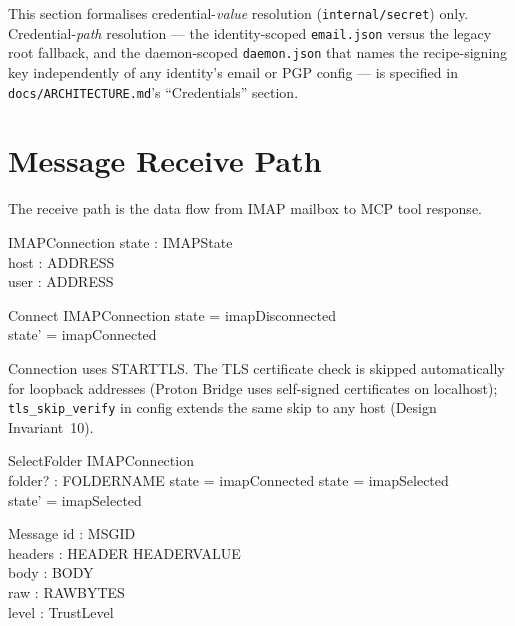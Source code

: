 \documentclass[a4paper,10pt,fleqn]{article}
\begin{document}
This section formalises credential-\emph{value} resolution
(\texttt{internal/secret}) only. Credential-\emph{path} resolution ---
the identity-scoped \texttt{email.json} versus the legacy root
fallback, and the daemon-scoped \texttt{daemon.json} that names the
recipe-signing key independently of any identity's email or PGP
config --- is specified in \texttt{docs/ARCHITECTURE.md}'s
``Credentials'' section.

\section{Message Receive Path}

The receive path is the data flow from IMAP mailbox to MCP tool
response.

\begin{schema}{IMAPConnection}
  state : IMAPState \\
  host : ADDRESS \\
  user : ADDRESS
\end{schema}

\begin{schema}{Connect}
  \Delta IMAPConnection
  \where
  state = imapDisconnected \\
  state' = imapConnected
\end{schema}

Connection uses STARTTLS.  The TLS certificate check is skipped
automatically for loopback addresses (Proton Bridge uses self-signed
certificates on localhost); \texttt{tls\_skip\_verify} in config
extends the same skip to any host (Design Invariant~10).

\begin{schema}{SelectFolder}
  \Delta IMAPConnection \\
  folder? : FOLDERNAME
  \where
  state = imapConnected \lor state = imapSelected \\
  state' = imapSelected
\end{schema}

\begin{schema}{Message}
  id : MSGID \\
  headers : HEADER \pfun HEADERVALUE \\
  body : BODY \\
  raw : RAWBYTES \\
  level : TrustLevel
\end{schema}
\end{document}
